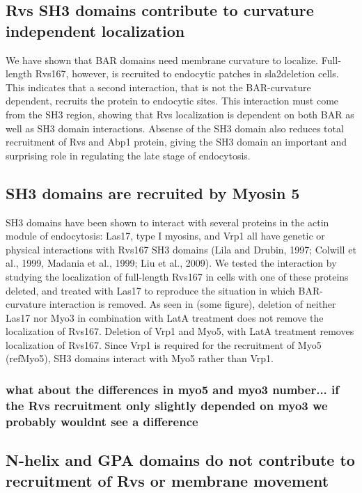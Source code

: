 \documentclass[9pt,lineno]{elife}
\begin{document}
\subsection{Rvs SH3 domains contribute to curvature independent localization}
We have shown that BAR domains need membrane curvature to localize. Full-length Rvs167, however, is recruited to endocytic patches in sla2deletion cells. This indicates that a second interaction, that is not the BAR-curvature dependent, recruits the protein to endocytic sites. This interaction must come from the SH3 region, showing that Rvs localization is dependent on both BAR as well as SH3 domain interactions. Absense of the SH3 domain also reduces total recruitment of Rvs and Abp1 protein, giving the SH3 domain an important and surprising role in regulating the late stage of endocytosis. 

\subsection{SH3 domains are recruited by Myosin 5}
SH3 domains have been shown to interact with several proteins in the actin module of endocytosis: Las17, type I myosins, and Vrp1 all have genetic or physical interactions with Rvs167 SH3 domains (Lila and Drubin, 1997; Colwill et al., 1999, Madania et al., 1999; Liu et al., 2009). 
We tested the interaction by studying the localization of full-length Rvs167 in cells with one of these proteins deleted, and treated with Las17 to reproduce the situation in which BAR-curvature interaction is removed. 
As seen in (some figure), deletion of neither Las17 nor Myo3 in combination with LatA treatment does not remove the localization of Rvs167. Deletion of Vrp1 and Myo5, with LatA treatment removes localization of Rvs167. Since Vrp1 is required for the recruitment of Myo5 (refMyo5), SH3 domains interact with Myo5 rather than Vrp1. 
\subsubsection{\color{red} 
	what about the differences in myo5 and myo3 number... if the Rvs recruitment only slightly depended on myo3 we probably wouldnt see a difference
}

\subsection{N-helix and GPA domains do not contribute to recruitment of Rvs or membrane movement}
\lipsum[12]
	
\end{document}
